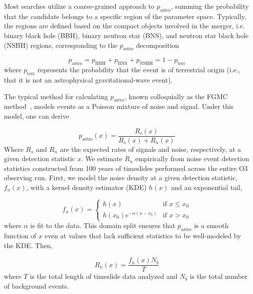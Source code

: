 \begin{refsection}
Most searches utilize a coarse-grained approach to $p_\mathrm{astro}$, summing the probability that the candidate belongs to a specific region of the parameter space.
Typically, the regions are defined based on the compact objects involved in the merger, i.e. binary black hole (BBH), binary neutron star (BNS), and neutron star black hole (NSBH) regions, corresponding to the $p_\mathrm{astro}$ decomposition 

\begin{equation}
    p_\mathrm{astro} = p_\mathrm{BBH} + p_\mathrm{BNS} + p_\mathrm{NSBH} = 1 - p_\mathrm{terr}
\end{equation}
where $p_\mathrm{terr}$ represents the probability that the event is of terrestrial origin (i.e., that it is not an astrophysical gravitational-wave event).


The typical method for calculating $p_\mathrm{astro}$, known colloquially as the FGMC method~\cite{Farr_2015}, models events as a Poisson mixture of noise and signal. Under this model, one can derive

\begin{equation}
    p_\mathrm{astro}(x) = \frac{R_s(x)}{R_s(x) + R_n(x)}
\end{equation}
Where $R_s$ and $R_n$ are the expected rates of signals and noise, respectively, at a given detection statistic $x$.
We estimate $R_n$ empirically from noise event detection statistics constructed from 100 years of timeslides performed across the entire O3 observing run. 
First, we model the noise density at a given detection statistic, $f_n(x)$, with a kernel density estimator (KDE) $h(x)$ and an exponential tail,

\begin{equation}
f_n(x)=
    \begin{cases}
        h(x) & \text{if } x \leq x_0 \\
        h(x_0) e^{-\alpha (x - x_0)} & \text{if } x > x_0
    \end{cases}
\end{equation}
where $\alpha$ is fit to the data. This domain split ensures that $p_\mathrm{astro}$ is a smooth function of $x$ even at values that lack sufficient statistics to be well-modeled by the KDE. 
Then,

\begin{equation}
    R_n(x) = \frac{f_n(x) N_b}{T}
\end{equation}
where $T$ is the total length of timeslide data analyzed and $N_b$ is the total number of background events.


\end{refsection}
